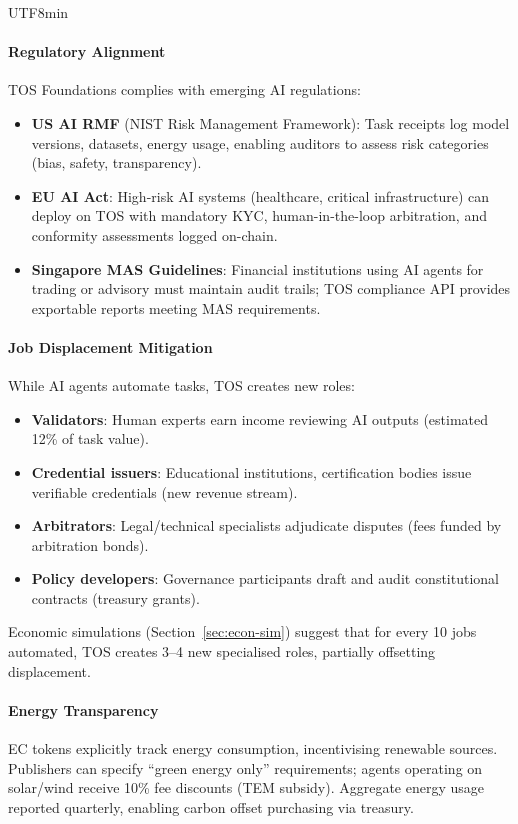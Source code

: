 \documentclass[11pt]{article}
\begin{document}
\begin{CJK}{UTF8}{min}
\paragraph{Regulatory Alignment} TOS Foundations complies with emerging AI regulations:
\begin{itemize}[noitemsep]
  \item \textbf{US AI RMF} (NIST Risk Management Framework): Task receipts log model versions, datasets, energy usage, enabling auditors to assess risk categories (bias, safety, transparency).
  \item \textbf{EU AI Act}: High-risk AI systems (healthcare, critical infrastructure) can deploy on TOS with mandatory KYC, human-in-the-loop arbitration, and conformity assessments logged on-chain.
  \item \textbf{Singapore MAS Guidelines}: Financial institutions using AI agents for trading or advisory must maintain audit trails; TOS compliance API provides exportable reports meeting MAS requirements.
\end{itemize}

\paragraph{Job Displacement Mitigation} While AI agents automate tasks, TOS creates new roles:
\begin{itemize}[noitemsep]
  \item \textbf{Validators}: Human experts earn income reviewing AI outputs (estimated 12\% of task value).
  \item \textbf{Credential issuers}: Educational institutions, certification bodies issue verifiable credentials (new revenue stream).
  \item \textbf{Arbitrators}: Legal/technical specialists adjudicate disputes (fees funded by arbitration bonds).
  \item \textbf{Policy developers}: Governance participants draft and audit constitutional contracts (treasury grants).
\end{itemize}
Economic simulations (Section~\ref{sec:econ-sim}) suggest that for every 10 jobs automated, TOS creates 3--4 new specialised roles, partially offsetting displacement.

\paragraph{Energy Transparency} EC tokens explicitly track energy consumption, incentivising renewable sources. Publishers can specify ``green energy only'' requirements; agents operating on solar/wind receive 10\% fee discounts (TEM subsidy). Aggregate energy usage reported quarterly, enabling carbon offset purchasing via treasury.


\end{CJK}
\end{document}
